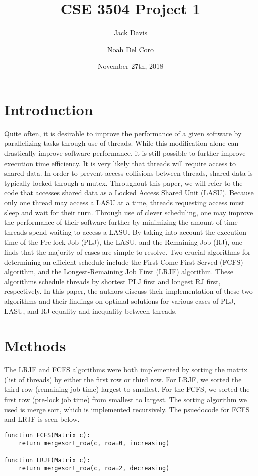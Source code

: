 \documentclass[letterpaper,12pt]{article}
\begin{document}
\title{CSE 3504  Project 1}
\author[1]{Jack Davis}
\author[1]{Noah Del Coro}
\date{November 27th, 2018}
\maketitle

\section{Introduction}
Quite often, it is desirable to improve the performance of a given software by parallelizing tasks through use of threads.
While this modification alone can drastically improve software performance, it is still possible to further improve execution time efficiency.
It is very likely that threads will require access to shared data.
In order to prevent access collisions between threads, shared data is typically locked through a mutex.
Throughout this paper, we will refer to the code that accesses shared data as a Locked Access Shared Unit (LASU).
Because only one thread may access a LASU at a time, threads requesting access must sleep and wait for their turn.
Through use of clever scheduling, one may improve the performance of their software further by minimizing the amount of time threads spend waiting to access a LASU.
By taking into account the execution time of the Pre-lock Job (PLJ), the LASU, and the Remaining Job (RJ), one finds that the majority of cases are simple to resolve.
Two crucial algorithms for determining an efficient schedule include the First-Come First-Served (FCFS) algorithm, and the Longest-Remaining Job First (LRJF) algorithm.
These algorithms schedule threads by shortest PLJ first and longest RJ first, respectively.
In this paper, the authors discuss their implementation of these two algorithms and their findings on optimal solutions for various cases of PLJ, LASU, and RJ equality and inequality between threads.


\section{Methods}
The LRJF and FCFS algorithms were both implemented by sorting the matrix (list of threads) by either the first row or third row. 
For LRJF, we sorted the third row (remaining job time) largest to smallest.
For the FCFS, we sorted the first row (pre-lock job time) from smallest to largest.
The sorting algorithm we used is merge sort, which is implemented recursively. 
The psuedocode for FCFS and LRJF is seen below.
\begin{verbatim}
function FCFS(Matrix c):
    return mergesort_row(c, row=0, increasing)
    
function LRJF(Matrix c):
    return mergesort_row(c, row=2, decreasing)
\end{verbatim}
\end{document}
